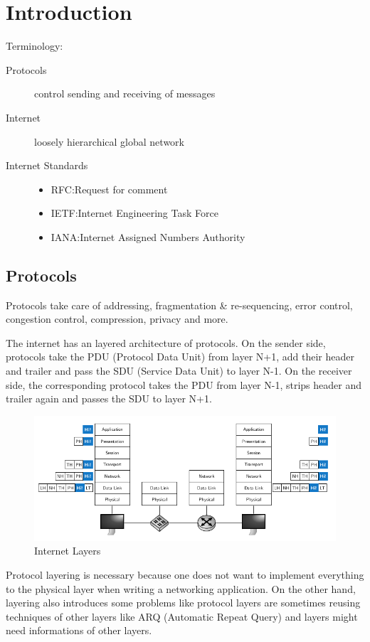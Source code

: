 
\section{Introduction}
Terminology:
\begin{description}
  \item[Protocols] control sending and receiving of messages
  \item[Internet] loosely hierarchical global network
  \item[Internet Standards]\hfill
    \begin{itemize}
      \item RFC:\@ Request for comment
      \item IETF:\@ Internet Engineering Task Force
      \item IANA:\@ Internet Assigned Numbers Authority
    \end{itemize}
\end{description}

\subsection{Protocols}
Protocols take care of addressing, fragmentation \& re-sequencing, error control, congestion control, compression, privacy and more.

The internet has an layered architecture of protocols.
On the sender side, protocols take the PDU (Protocol Data Unit) from layer N+1, add their header and trailer and pass the SDU (Service Data Unit) to layer N-1.
On the receiver side, the corresponding protocol takes the PDU from layer N-1, strips header and trailer again and passes the SDU to layer N+1.
\begin{figure}[H]
  \centering
  \includegraphics[width=.6\textwidth]{figures/internet_layering.png}
  \caption{Internet Layers}
\end{figure}

Protocol layering is necessary because one does not want to implement everything to the physical layer when writing a networking application.
On the other hand, layering also introduces some problems like protocol layers are sometimes reusing techniques of other layers like ARQ (Automatic Repeat Query) and layers might need informations of other layers.

